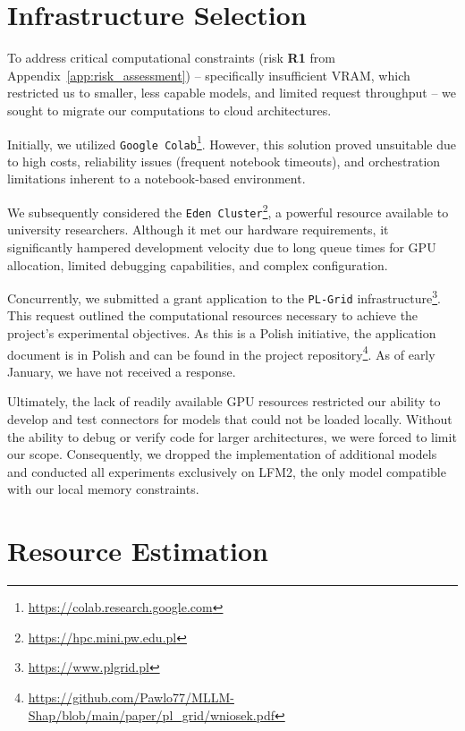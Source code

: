 \begin{appendices}
    \section{Infrastructure Selection}
    \label{sec:compute__infrastructure}

    To address critical computational constraints (risk \textbf{R1} from Appendix~\ref{app:risk_assessment}) -- specifically insufficient VRAM, which restricted us to smaller, less capable models, and limited request throughput -- we sought to migrate our computations to cloud architectures.

    Initially, we utilized \texttt{Google Colab}\footnote{\url{https://colab.research.google.com}}. However, this solution proved unsuitable due to high costs, reliability issues (frequent notebook timeouts), and orchestration limitations inherent to a notebook-based environment.

    We subsequently considered the \texttt{Eden Cluster}\footnote{\url{https://hpc.mini.pw.edu.pl}}, a powerful resource available to university researchers. Although it met our hardware requirements, it significantly hampered development velocity due to long queue times for GPU allocation, limited debugging capabilities, and complex configuration.

    Concurrently, we submitted a grant application to the \texttt{PL-Grid} infrastructure\footnote{\url{https://www.plgrid.pl}}. This request outlined the computational resources necessary to achieve the project's experimental objectives. As this is a Polish initiative, the application document is in Polish and can be found in the project repository\footnote{\url{https://github.com/Pawlo77/MLLM-Shap/blob/main/paper/pl_grid/wniosek.pdf}}. As of early January, we have not received a response.

    Ultimately, the lack of readily available GPU resources restricted our ability to develop and test connectors for models that could not be loaded locally. Without the ability to debug or verify code for larger architectures, we were forced to limit our scope. Consequently, we dropped the implementation of additional models and conducted all experiments exclusively on LFM2, the only model compatible with our local memory constraints.

    \section{Resource Estimation}
    \label{sec:compute__estimation}


\end{appendices}

